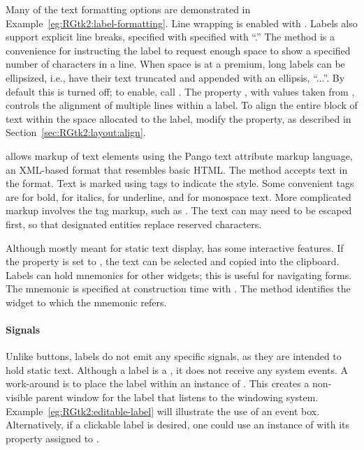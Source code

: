 Many of the text formatting options are demonstrated in
Example~\ref{eg:RGtk2:label-formatting}. Line wrapping is enabled with
. Labels also support explicit line
breaks, specified with specified with ``\code{\backslashn}.'' The
 method is a convenience for instructing the
label to request enough space to show a specified number of
characters in a line.  When space is at a premium, long labels can be
ellipsized, i.e., have their text truncated and appended with an
ellipsis, ``...''.  By default this is turned off; to enable, call
.  The property , with
values taken from , controls the alignment of
multiple lines within a label. To align the entire block of text
within the space allocated to the label, modify the 
property, as described in Section~\ref{sec:RGtk2:layout:align}.

\GTK\/ allows markup of text elements using the Pango text attribute
markup language, an XML-based format that resembles basic HTML. The
method  accepts text in the format. Text
is marked using tags to indicate the style. Some convenient tags are
 for bold,  for italics,  for
underline, and  for monospace text. More complicated markup
involves the  tag markup, such as . The text can may need to be escaped
first, so that designated entities replace reserved characters.

Although mostly meant for static text display,  has
some interactive features. If the  property is set to
, the text can be selected and copied into the clipboard.
Labels can hold mnemonics for other widgets; this is useful for
navigating forms. The mnemonic is specified at construction time with
. The
 method identifies the widget to
which the mnemonic refers.


\paragraph{Signals}
Unlike buttons, labels do not emit any specific signals, as they are
intended to hold static text. Although a label is a ,
it does not receive any system events. A work-around is to place the
label within an instance of . This creates a
non-visible parent window for the label that listens to the windowing
system. Example~\ref{eg:RGtk2:editable-label} will illustrate the use
of an event box.  Alternatively, if a clickable label is desired, one
could use an instance of  with its 
property assigned to .

